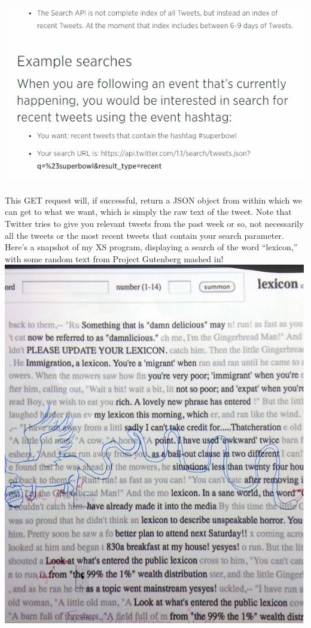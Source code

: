 \documentclass[a0,final]{a0poster}
\begin{document}
\begin{multicols}{3}
\includegraphics{tweet3.jpg}\\
\\
This GET request will, if successful, return a JSON object from within which we can get to what we want, which is simply the raw text of the tweet. Note that Twitter tries to give you relevant tweets from the past week or so, not necessarily all the tweets or the most recent tweets that contain your search parameter. Here's a snapshot of my XS program, displaying a search of the word ``lexicon,'' with some random text from Project Gutenberg mashed in!\\


\includegraphics{tweet4.jpg}\\
\\


\end{multicols}
\end{document}
